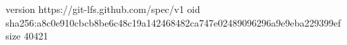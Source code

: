 version https://git-lfs.github.com/spec/v1
oid sha256:a8c0e910cbcb8be6c48c19a142468482ca747e02489096296a9e9eba229399ef
size 40421
